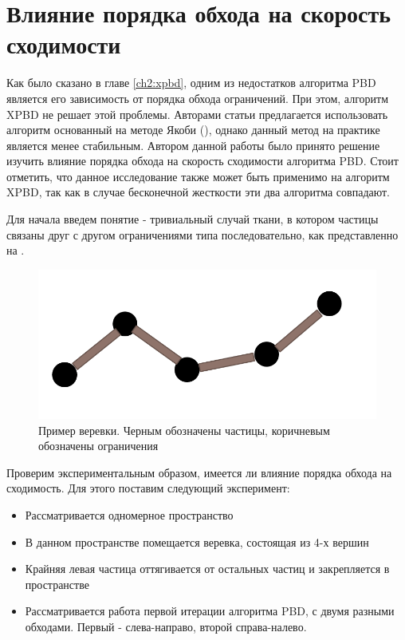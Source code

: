 \section{Влияние порядка обхода на скорость сходимости} \label{ch3:sec1}
	Как было сказано в главе \ref{ch2:xpbd}, одним из недостатков алгоритма PBD является его зависимость от порядка обхода ограничений. При этом, алгоритм XPBD не решает этой проблемы. Авторами статьи \cite{muller2020detailed} предлагается использовать алгоритм основанный на методе Якоби (), однако данный метод на практике является менее стабильным. Автором данной работы было принято решение изучить влияние порядка обхода на скорость сходимости алгоритма PBD. Стоит отметить, что данное исследование также может быть применимо на алгоритм XPBD, так как в случае бесконечной жесткости эти два алгоритма совпадают.
	
	Для начала введем понятие  - тривиальный случай ткани, в котором частицы связаны друг с другом ограничениями типа  последовательно, как представленно на .
	
	\begin{figure}[ht!] 
		\center
		\includegraphics [scale=0.3] {my_folder/images//rope}
		\caption{Пример веревки. Черным обозначены частицы, коричневым обозначены ограничения}
		\label{fig:rope}  
	\end{figure}
	
	Проверим экспериментальным образом, имеется ли влияние порядка обхода на сходимость. Для этого поставим следующий эксперимент:
	\begin{itemize}
		\item Рассматривается одномерное пространство
		\item В данном пространстве помещается веревка, состоящая из 4-х вершин
		\item Крайняя левая частица оттягивается от остальных частиц и закрепляется в пространстве
		\item Рассматривается работа первой итерации алгоритма PBD, с двумя разными обходами. Первый - слева-направо, второй справа-налево.
	\end{itemize}
	
